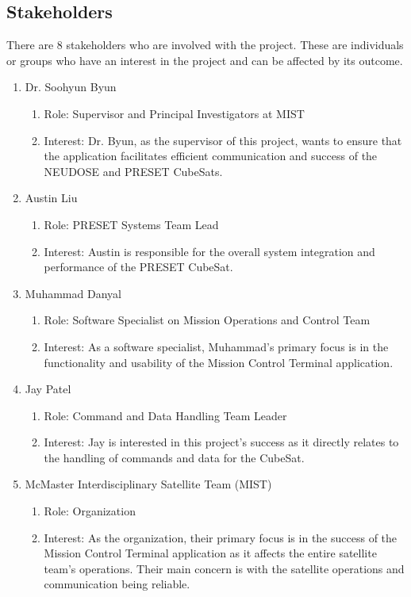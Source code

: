 \documentclass{article}
\begin{document}
\subsection{Stakeholders}
There are 8 stakeholders who are involved with the project. These are individuals or groups who have an interest in the project and can be affected by its outcome.
\begin{enumerate}
    \item Dr. Soohyun Byun
    \begin{enumerate}
        \item Role: Supervisor and Principal Investigators at MIST
        \item Interest: Dr. Byun, as the supervisor of this project, wants to ensure that the application facilitates efficient communication and success of the NEUDOSE and PRESET CubeSats.
    \end{enumerate}
    \item Austin Liu
    \begin{enumerate}
        \item Role: PRESET Systems Team Lead 
        \item Interest: Austin is responsible for the overall system integration and performance of the PRESET CubeSat.
    \end{enumerate}
    \item Muhammad Danyal
    \begin{enumerate}
        \item Role: Software Specialist on Mission Operations and Control Team
        \item Interest: As a software specialist, Muhammad's primary focus is in the functionality and usability of the Mission Control Terminal application. 
    \end{enumerate}
    \item Jay Patel
    \begin{enumerate}
        \item Role: Command and Data Handling Team Leader
        \item Interest: Jay is interested in this project's success as it directly relates to the handling of commands and data for the CubeSat. 
    \end{enumerate}
    \item McMaster Interdisciplinary Satellite Team (MIST)
    \begin{enumerate}
        \item Role: Organization
        \item Interest: As the organization, their primary focus is in the success of the Mission Control Terminal application as it affects the entire satellite team's operations. Their main concern is with the satellite operations and communication being reliable.

\end{enumerate}
\end{enumerate}
\end{document}
